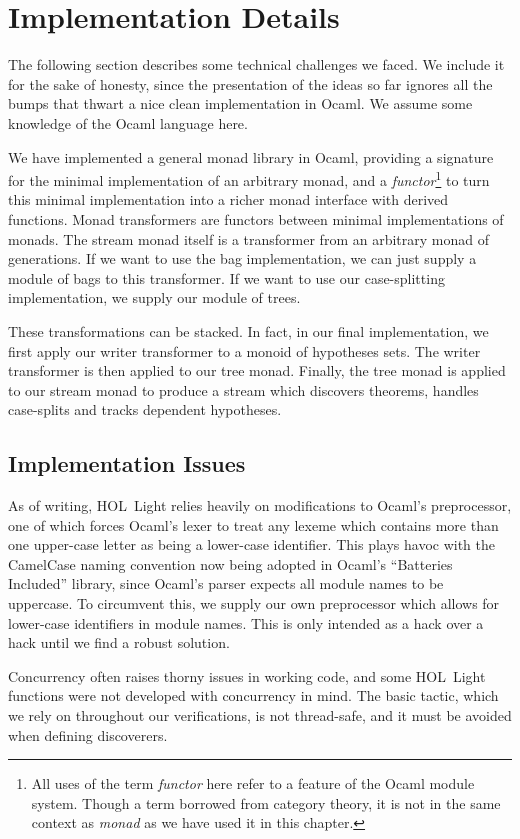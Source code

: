 \section{Implementation Details}
The following section describes some technical challenges we faced. We include it for the sake of honesty, since the presentation of the ideas so far ignores all the bumps that thwart a nice clean implementation in Ocaml. We assume some knowledge of the Ocaml language here.

We have implemented a general monad library in Ocaml, providing a signature for the minimal implementation of an arbitrary monad, and a \emph{functor}\footnote{All uses of the term \emph{functor} here refer to a feature of the Ocaml module system. Though a term borrowed from category theory, it is not in the same context as \emph{monad} as we have used it in this chapter.} to turn this minimal implementation into a richer monad interface with derived functions. Monad transformers are functors between minimal implementations of monads. The stream monad itself is a transformer from an arbitrary monad of generations. If we want to use the bag implementation, we can just supply a module of bags to this transformer. If we want to use our case-splitting implementation, we supply our module of trees. 

These transformations can be stacked. In fact, in our final implementation, we first apply our writer transformer to a monoid of hypotheses sets. The writer transformer is then applied to our tree monad. Finally, the tree monad is applied to our stream monad to produce a stream which discovers theorems, handles case-splits and tracks dependent hypotheses.

\subsection{Implementation Issues}
As of writing, HOL~Light relies heavily on modifications to Ocaml's preprocessor, one of which forces Ocaml's lexer to treat any lexeme which contains more than one upper-case letter as being a lower-case identifier. This plays havoc with the CamelCase naming convention now being adopted in Ocaml's ``Batteries Included'' library, since Ocaml's parser expects all module names to be uppercase. To circumvent this, we supply our own preprocessor which allows for lower-case identifiers in module names. This is only intended as a hack over a hack until we find a robust solution.

Concurrency often raises thorny issues in working code, and some HOL~Light functions were not developed with concurrency in mind. The basic  tactic, which we rely on throughout our verifications, is not thread-safe, and it must be avoided when defining discoverers.

